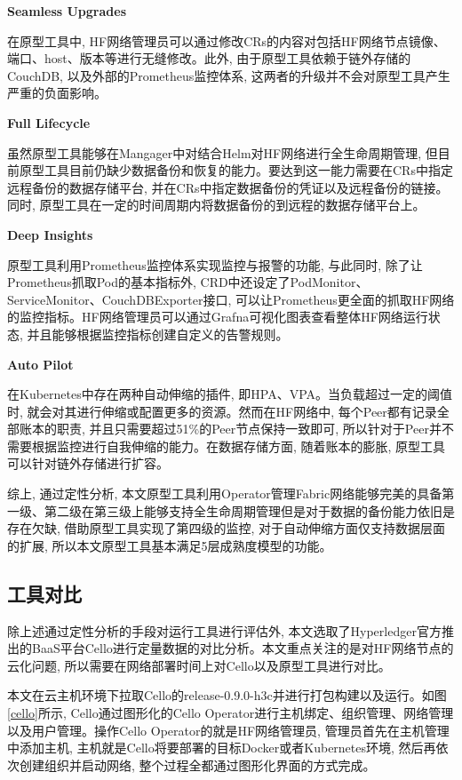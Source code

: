 \textbf{Seamless Upgrades}

在原型工具中, HF网络管理员可以通过修改CRs的内容对包括HF网络节点镜像、端口、host、版本等进行无缝修改。此外, 由于原型工具依赖于链外存储的CouchDB, 以及外部的Prometheus监控体系, 这两者的升级并不会对原型工具产生严重的负面影响。 

\textbf{Full Lifecycle}

虽然原型工具能够在Mangager中对结合Helm对HF网络进行全生命周期管理, 但目前原型工具目前仍缺少数据备份和恢复的能力。要达到这一能力需要在CRs中指定远程备份的数据存储平台, 并在CRs中指定数据备份的凭证以及远程备份的链接。同时, 原型工具在一定的时间周期内将数据备份的到远程的数据存储平台上。

\textbf{Deep Insights}

原型工具利用Prometheus监控体系实现监控与报警的功能, 与此同时, 除了让Prometheus抓取Pod的基本指标外, CRD中还设定了PodMonitor、ServiceMonitor、CouchDBExporter接口, 可以让Prometheus更全面的抓取HF网络的监控指标。HF网络管理员可以通过Grafna可视化图表查看整体HF网络运行状态, 并且能够根据监控指标创建自定义的告警规则。

\textbf{Auto Pilot}

在Kubernetes中存在两种自动伸缩的插件, 即HPA、VPA。当负载超过一定的阈值时, 就会对其进行伸缩或配置更多的资源。然而在HF网络中, 每个Peer都有记录全部账本的职责, 并且只需要超过51\%的Peer节点保持一致即可, 所以针对于Peer并不需要根据监控进行自我伸缩的能力。在数据存储方面, 随着账本的膨胀, 原型工具可以针对链外存储进行扩容。

综上, 通过定性分析, 本文原型工具利用Operator管理Fabric网络能够完美的具备第一级、第二级在第三级上能够支持全生命周期管理但是对于数据的备份能力依旧是存在欠缺, 借助原型工具实现了第四级的监控, 对于自动伸缩方面仅支持数据层面的扩展, 所以本文原型工具基本满足5层成熟度模型的功能。

\subsection{工具对比} \label{section: tool_comparison}

除上述通过定性分析的手段对运行工具进行评估外, 本文选取了Hyperledger官方推出的BaaS平台Cello进行定量数据的对比分析。本文重点关注的是对HF网络节点的云化问题, 所以需要在网络部署时间上对Cello以及原型工具进行对比。

本文在云主机环境下拉取Cello的release-0.9.0-h3c并进行打包构建以及运行。如图\ref{cello}所示, Cello通过图形化的Cello Operator进行主机绑定、组织管理、网络管理以及用户管理。操作Cello Operator的就是HF网络管理员, 管理员首先在主机管理中添加主机, 主机就是Cello将要部署的目标Docker或者Kubernetes环境, 然后再依次创建组织并启动网络, 整个过程全都通过图形化界面的方式完成。

